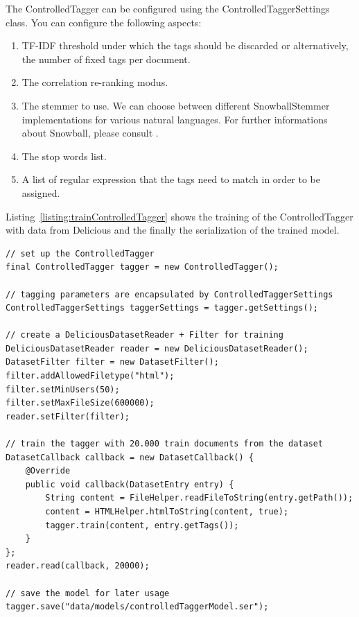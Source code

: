 The ControlledTagger can be configured using the ControlledTaggerSettings class. You can configure the following aspects:

\begin{enumerate}
\item TF-IDF threshold under which the tags should be discarded or alternatively, the number of fixed tags per document.
\item The correlation re-ranking modus.
\item The stemmer to use. We can choose between different SnowballStemmer implementations for various natural languages. For further informations about Snowball, please consult \cite{snowball}.
\item The stop words list.
\item A list of regular expression that the tags need to match in order to be assigned.
\end{enumerate}

Listing~\ref{listing:trainControlledTagger} shows the training of the ControlledTagger with data from Delicious and the finally the serialization of the trained model.

\begin{codelisting}
\begin{lstlisting}[label=listing:trainControlledTagger,caption=Training the controlled tagger.,frame=tb]
// set up the ControlledTagger
final ControlledTagger tagger = new ControlledTagger();
        
// tagging parameters are encapsulated by ControlledTaggerSettings
ControlledTaggerSettings taggerSettings = tagger.getSettings();
        
// create a DeliciousDatasetReader + Filter for training
DeliciousDatasetReader reader = new DeliciousDatasetReader();
DatasetFilter filter = new DatasetFilter();
filter.addAllowedFiletype("html");
filter.setMinUsers(50);
filter.setMaxFileSize(600000);
reader.setFilter(filter);
        
// train the tagger with 20.000 train documents from the dataset
DatasetCallback callback = new DatasetCallback() {
    @Override
    public void callback(DatasetEntry entry) {
        String content = FileHelper.readFileToString(entry.getPath());
        content = HTMLHelper.htmlToString(content, true);
        tagger.train(content, entry.getTags());
    }
};
reader.read(callback, 20000);
        
// save the model for later usage
tagger.save("data/models/controlledTaggerModel.ser");
\end{lstlisting}
\end{codelisting}

